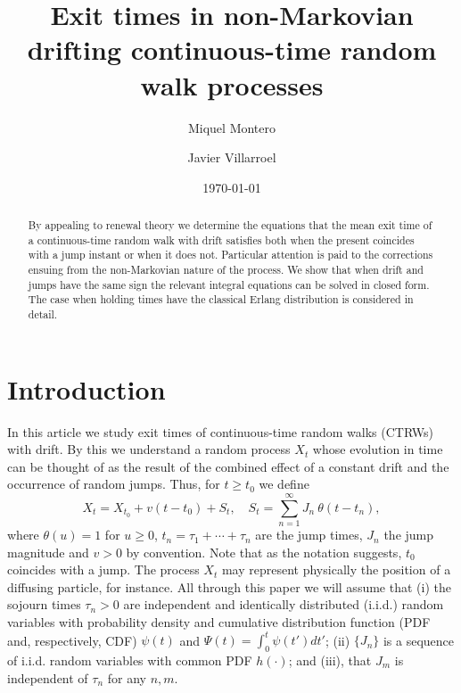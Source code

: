 \documentclass[english,aps,a4paper,twocolumn,showpacs,showkeys,amsfonts,amsmath,amssymb,amscd,nofootinbib]{revtex4}
\newcommand{\1}{\'\i}
\begin{document}
\title{Exit times in non-Markovian drifting continuous-time random walk processes}

\author{Miquel Montero}
\author{Javier  Villarroel}


\begin{abstract}
By appealing to  renewal theory we   determine   the equations
that the mean exit time of a continuous-time random walk with
drift  satisfies both when the present
 coincides with a jump instant or when it does not.  Particular attention
is paid to the corrections ensuing from the non-Markovian nature
 of the process.   We show that
 when drift and jumps have the same sign the relevant integral
 equations can be solved in closed form. The case when  holding
 times have the
 classical Erlang distribution is considered in detail.

\end{abstract}
\date{\today}
\maketitle

\section{Introduction}

 In this article we
 study exit times of  continuous-time random walks (CTRWs) with
 drift. By this we understand a
random process $X_t$ whose evolution in
 time
 can be thought of  as the result of the combined effect of a constant
drift and the occurrence of random
 jumps. Thus,  for $t\geqslant t_0$ we define
\begin{equation}
X_t=X_{t_0}+v(t-t_0)+S_{t}, \quad S_t=\sum_{n=1}^\infty J_n\
\theta(t-t_n), \label{process}%
\end{equation}
where $\theta(u)=1$ for $u \geqslant 0$,
$t_n=\tau_1+\cdots+\tau_n$ are the jump  times,  $J_n$ the
jump magnitude and $v>0$ by convention. Note that as the notation
suggests, $t_0$ coincides with a jump.  The process $X_t$ may
represent physically the position of a diffusing particle, for
instance. All through this paper  we will assume that (i) the
sojourn times $\tau_n>0$
 are independent and identically distributed (i.i.d.) random variables with
probability density and cumulative distribution function (PDF and,
respectively, CDF) $\psi(t)$ and $\Psi(t)=  \int_0^t \psi(t')d
t'$; (ii) $\{J_n\}$ is a sequence of i.i.d. random variables  with
common PDF $h(\cdot)$; and  (iii), that  $ J_m$ is independent of $\tau_n $ for any $n,m$.
\end{document}
